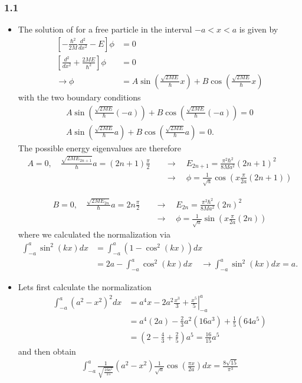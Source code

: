 \documentclass[10pt,a4paper]{book}
\theoremstyle{definition}
\begin{document}
\subsubsection{1.1}
\begin{itemize}
\item The solution of for a free particle in the interval $-a<x<a$ is given by
\begin{align}
    \left[-\frac{\hbar^2}{2M}\frac{d^2}{dx^2}-E\right]\phi&=0\\
    \left[\frac{d^2}{dx^2}+\frac{2ME}{\hbar^2}\right]\phi&=0\\
    \rightarrow\phi&=A\sin\left(\frac{\sqrt{2ME}}{\hbar}x\right)+B\cos\left(\frac{\sqrt{2ME}}{\hbar}x\right)
\end{align}    
with the two boundary conditions
\begin{align} 
A\sin\left(\frac{\sqrt{2ME}}{\hbar}(-a)\right)+B\cos\left(\frac{\sqrt{2ME}}{\hbar}(-a)\right)=0\\
A\sin\left(\frac{\sqrt{2ME}}{\hbar}a\right)+B\cos\left(\frac{\sqrt{2ME}}{\hbar}a\right)=0.
\end{align}
The possible energy eigenvalues are therefore
\begin{align}
    A=0,\quad\frac{\sqrt{2ME_{2n+1}}}{\hbar}a=(2n+1)\frac{\pi}{2}
    &\quad\rightarrow\quad E_{2n+1}=\frac{\pi^2\hbar^2}{8Ma^2}(2n+1)^2\\
    &\quad\rightarrow\quad
    \phi=\frac{1}{\sqrt{a}}\cos\left(x\frac{\pi}{2a}(2n+1)\right)
\end{align}   
    
\begin{align}    
    B=0,\quad\frac{\sqrt{2ME_{2n}}}{\hbar}a=2n\frac{\pi}{2}
    &\quad\rightarrow\quad E_{2n}=\frac{\pi^2\hbar^2}{8Ma^2}(2n)^2\\
    &\quad\rightarrow\quad
    \phi=\frac{1}{\sqrt{a}}\sin\left(x\frac{\pi}{2a}(2n)\right)
\end{align}
where we calculated the normalization via
\begin{align}
    \int_{-a}^a\sin^2(kx)dx
    &=\int_{-a}^a(1-\cos^2(kx))dx\\
    &=2a-\int_{-a}^a\cos^2(kx)dx\quad\rightarrow\int_{-a}^a\sin^2(kx)dx=a.
\end{align}

\item Lets first calculate the normalization
\begin{align}
    \int_{-a}^a(a^2-x^2)^2dx
    &=\left.a^4x-2a^2\frac{x^3}{3}+\frac{x^5}{5}\right|_{-a}^a\\
    &=a^4(2a)-\frac{2}{3}a^2(16a^3)+\frac{1}{5}(64a^5)\\
    &=\left(2-\frac{4}{3}+\frac{2}{5}\right)a^5=\frac{16}{15}a^5
\end{align}
and then obtain
\begin{align}
    \int_{-a}^a \frac{1}{\sqrt{\frac{16a^5}{15}}} \left(a^2-x^2\right)\frac{1}{\sqrt{a}} \cos \left(\frac{\pi  x}{2 a}\right)dx=\frac{8\sqrt{15}}{\pi^3}
\end{align}
\end{itemize}
\end{document}
